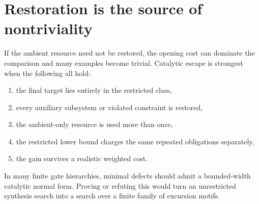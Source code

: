 \section{Restoration is the source of nontriviality}
If the ambient resource need not be restored, the opening cost can dominate the comparison and many examples become trivial.  Catalytic escape is strongest when the following all hold:
\begin{enumerate}
\item the final target lies entirely in the restricted class,
\item every auxiliary subsystem or violated constraint is restored,
\item the ambient-only resource is used more than once,
\item the restricted lower bound charges the same repeated obligations separately,
\item the gain survives a realistic weighted cost.
\end{enumerate}

\begin{conjecturebox}
In many finite gate hierarchies, minimal defects should admit a bounded-width catalytic normal form.  Proving or refuting this would turn an unrestricted synthesis search into a search over a finite family of excursion motifs.
\end{conjecturebox}
